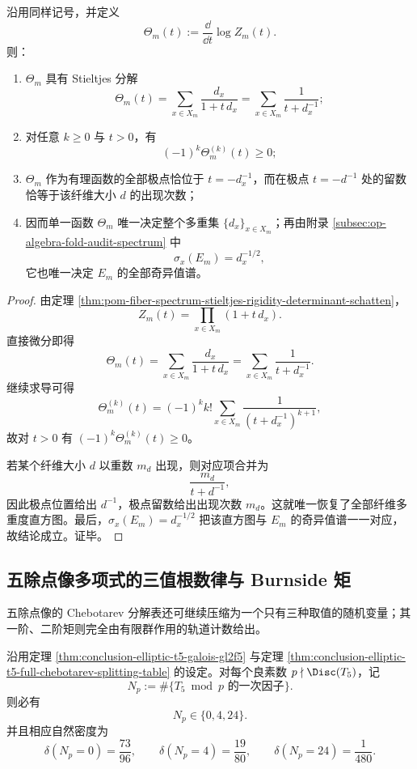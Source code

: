 \begin{theorem}\label{thm:derived-fiber-single-stieltjes-histogram-recovery}
沿用同样记号，并定义
\[
\Theta_m(t):=\frac{\dd}{\dd t}\log Z_m(t).
\]
则：
\begin{enumerate}
  \item \(\Theta_m\) 具有 Stieltjes 分解
  \[
  \Theta_m(t)
  =
  \sum_{x\in X_m}\frac{d_x}{1+t\,d_x}
  =
  \sum_{x\in X_m}\frac{1}{t+d_x^{-1}};
  \]
  \item 对任意 \(k\ge 0\) 与 \(t>0\)，有
  \[
  (-1)^k\Theta_m^{(k)}(t)\ge 0;
  \]
  \item \(\Theta_m\) 作为有理函数的全部极点恰位于 \(t=-d_x^{-1}\)，而在极点 \(t=-d^{-1}\) 处的留数恰等于该纤维大小 \(d\) 的出现次数；
  \item 因而单一函数 \(\Theta_m\) 唯一决定整个多重集 \(\{d_x\}_{x\in X_m}\)；再由附录 \ref{subsec:op-algebra-fold-audit-spectrum} 中
  \[
  \sigma_x(E_m)=d_x^{-1/2},
  \]
  它也唯一决定 \(E_m\) 的全部奇异值谱。
\end{enumerate}
\end{theorem}

\begin{proof}
由定理 \ref{thm:pom-fiber-spectrum-stieltjes-rigidity-determinant-schatten}，
\[
Z_m(t)=\prod_{x\in X_m}(1+t\,d_x).
\]
直接微分即得
\[
\Theta_m(t)
=
\sum_{x\in X_m}\frac{d_x}{1+t\,d_x}
=
\sum_{x\in X_m}\frac{1}{t+d_x^{-1}}.
\]
继续求导可得
\[
\Theta_m^{(k)}(t)
=
(-1)^k k!\sum_{x\in X_m}\frac{1}{(t+d_x^{-1})^{k+1}},
\]
故对 \(t>0\) 有
\(
(-1)^k\Theta_m^{(k)}(t)\ge 0
\)。

若某个纤维大小 \(d\) 以重数 \(m_d\) 出现，则对应项合并为
\[
\frac{m_d}{t+d^{-1}},
\]
因此极点位置给出 \(d^{-1}\)，极点留数给出出现次数 \(m_d\)。这就唯一恢复了全部纤维多重度直方图。最后，\(\sigma_x(E_m)=d_x^{-1/2}\) 把该直方图与 \(E_m\) 的奇异值谱一一对应，故结论成立。证毕。
\end{proof}

\subsection{五除点像多项式的三值根数律与 Burnside 矩}

五除点像的 Chebotarev 分解表还可继续压缩为一个只有三种取值的随机变量；其一阶、二阶矩则完全由有限群作用的轨道计数给出。

\begin{theorem}\label{thm:derived-t5-three-valued-root-count}
沿用定理 \ref{thm:conclusion-elliptic-t5-galois-gl2f5} 与定理 \ref{thm:conclusion-elliptic-t5-full-chebotarev-splitting-table} 的设定。对每个良素数
\(
p\nmid \Disc(T_5)
\)，记
\[
N_p:=\#\{\text{\(T_5\bmod p\) 的一次因子}\}.
\]
则必有
\[
N_p\in\{0,4,24\}.
\]
并且相应自然密度为
\[
\delta(N_p=0)=\frac{73}{96},
\qquad
\delta(N_p=4)=\frac{19}{80},
\qquad
\delta(N_p=24)=\frac{1}{480}.
\]
\end{theorem}

